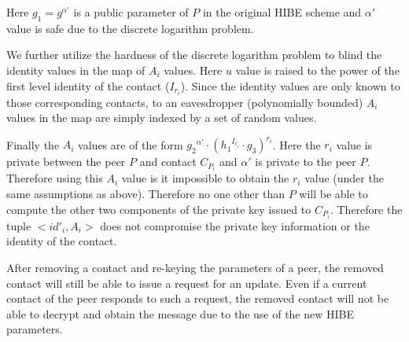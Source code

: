 Here $g_1 = g^{\alpha'}$ is a public parameter of $P$ in the original HIBE scheme and $\alpha'$ value is safe due to the discrete logarithm problem. 

We further utilize the hardness of the discrete logarithm problem to blind the identity values in the map of $A_i$ values. Here $u$ value is raised to the power of the first level identity of the contact ($I_{r_i}$). Since the identity values are only known to those corresponding contacts, to an eavesdropper (polynomially bounded) $A_i$ values in the map are simply indexed by a set of random values.

Finally the $A_i$ values are of the form ${{g_2}^{\alpha'}} \cdot {({{h_1}^{I_{r_i}}} \cdot {g_3} )}^{r_i}$. Here the $r_i$ value is private between the peer $P$ and contact $C_{P_i}$ and $\alpha'$ is private to the peer $P$. Therefore using this $A_i$ value is it impossible to obtain the $r_i$ value (under the same assumptions as above). Therefore no one other than $P$ will be able to compute the other two components of the private key issued to $C_{P_i}$. Therefore the tuple $<{id'}_i, A_i>$ does not compromise the private key information or the identity of the contact.

After removing a contact and re-keying the parameters of a peer, the removed contact will still be able to issue a request for an update. Even if a current contact of the peer responds to such a request, the removed contact will not be able to decrypt and obtain the message due to the use of the new HIBE parameters.

